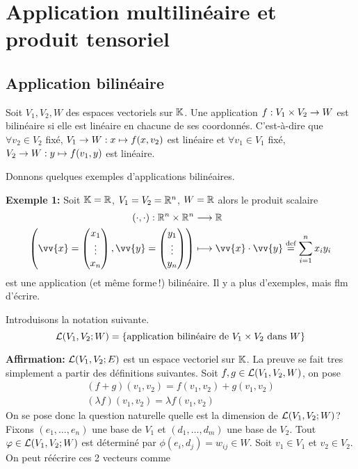 \let\cleardoublepage\clearpage
\chapter{Application multilinéaire et produit tensoriel}
\section{Application bilinéaire}

\begin{definition}
  Soit $V_1, V_2, W$ des espaces vectoriels sur $\mathbb{K}$. Une application $f: V_1 \times V_2 \rightarrow W$ est bilinéaire si elle est linéaire en chacune de ses coordonnés. C'est-à-dire que $\forall v_2 \in V_2$ fixé, $V_1 \rightarrow W : x \mapsto f(x, v_2)$ est linéaire et $\forall v_1\in V_1$ fixé, $V_2\rightarrow W : y \mapsto f(v_1, y)$ est linéaire.
\end{definition}
Donnons quelques exemples d'applications bilinéaires.
\par \textbf{Exemple 1:} Soit $\mathbb{K} = \mathbb{R}$,  $V_1 = V_2 = \mathbb{R}^n$, $W = \mathbb{R}$ alors le produit scalaire
\begin{align*}
  (\cdot, \cdot): \R^n \times \R^n &\lra \R \\
  \left( \vv{x} = \begin{pmatrix}x_1 \\ \vdots \\ x_n\end{pmatrix}, \vv{y} = \begin{pmatrix}y_1 \\ \vdots \\ y_n\end{pmatrix} \right)&\longmapsto \vv{x} \cdot \vv{y} \defeq \sum_{i=1}^n x_iy_i
\end{align*}
est une application (et même forme !) bilinéaire. Il y a plus d'exemples, mais flm d'écrire.
\par Introduisons la notation suivante.
$$\mathcal{L}(V_1, V_2; W) = \left\{ \text{application bilinéaire de } V_1 \times V_2 \text{ dans } W \right\}$$
\par \textbf{Affirmation:} $\mathcal{L}(V_1, V_2; E)$ est un espace vectoriel sur $\mathbb{K}$. La preuve se fait tres simplement a partir des définitions suivantes. Soit $f, g \in \mathcal{L}(V_1, V_2, W)$, on pose
\begin{gather*}
  (f+g)(v_1, v_2) = f(v_1, v_2) + g(v_1, v_2) \\
  (\lambda f)(v_1, v_2) = \lambda f(v_1, v_2)
\end{gather*}
On se pose donc la question naturelle quelle est la dimension de $\mathcal{L}(V_1, V_2; W)$? Fixons $(e_1, \dots, e_n)$ une base de  $V_1$ et $(d_1, \dots, d_m)$ une base de $V_2$. Tout $\varphi \in \mathcal{L}(V_1, V_2; W)$ est déterminé par $\phi(e_i, d_j) = w_{ij} \in  W$. Soit $v_1 \in V_1$ et $v_2\in V_2$. On peut réécrire ces 2 vecteurs comme
